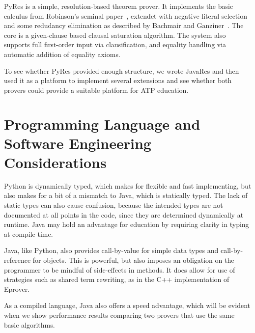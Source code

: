 \documentclass{llncs}
\begin{document}
PyRes is a simple, resolution-based theorem prover. It implements the
basic calculus from Robinson's seminal paper~\cite{Ro65}, extendet
with negative literal selection and some redudancy elimination as
described by Bachmair and Ganziner~\cite{BG:HBAR-2001}. The core is a
given-clause based clausal saturation algorithm. The system also
supports full first-order input via clausification, and equality
handling via automatic addition of equality axioms.

To see whether PyRes provided
enough structure, we wrote JavaRes and then used it as a platform to
implement several extensions and see whether both provers could
provide a suitable platform for ATP education.





\section{Programming Language and Software Engineering Considerations}

Python is dynamically typed, which makes for flexible and fast
implementing, but also makes for a bit of a mismatch to Java, which is
statically typed.  The lack of static types can also cause confusion,
because the intended types are not documented at all points in the
code, since they are determined dynamically at runtime.  Java may hold
an advantage for education by requiring clarity in typing at compile
time.

Java, like Python, also provides call-by-value for simple data types
and call-by-reference for objects.  This is powerful, but also imposes
an obligation on the programmer to be mindful of side-effects in
methods.  It does allow for use of strategies such as shared term
rewriting, as in the C++ implementation of Eprover.

As a compiled language, Java also offers a speed advantage, which will
be evident when we show performance results comparing two provers that
use the same basic algorithms.
\end{document}
